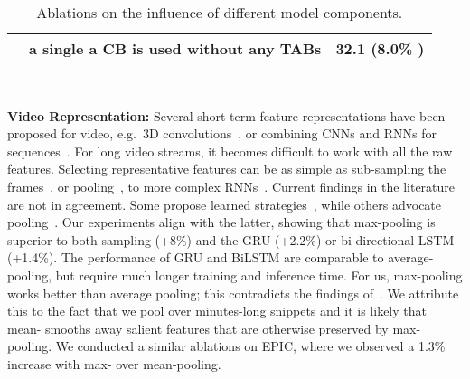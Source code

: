 \documentclass[runningheads]{llncs}
\makeatletter
\newcommand*{\eg}{e.g.\@\xspace}
\makeatother
\begin{document}
\begin{table}[t]
{\begin{tabular}{|l|l|l|l|l|l|l|}
    & \multicolumn{5}{l|}{\cellcolor{gray!20}a single a CB is used without any TABs} & \cellcolor{gray!20}32.1 (8.0\% ) \\ \hline
\end{tabular}}\\
\caption{Ablations on the influence of different model components.}
\label{tab:componentAblations} 
\end{table}  
 

\textbf{Video Representation:} Several short-term feature representations have been proposed for video, \eg~3D convolutions~\cite{tran2015learning}, or combining CNNs and RNNs for sequences~\cite{yue2015beyond,donahue2015long}. For long video streams, it becomes difficult to work with all the raw features. Selecting representative features can be as simple as sub-sampling the frames~\cite{feichtenhofer2019slowfast,xiao2020audiovisual}, or pooling~\cite{wang2016temporal}, to more complex RNNs~\cite{yue2015beyond}. Current findings in the literature are not in agreement. Some propose learned strategies~\cite{miech2017learnable,lee20182nd}, while others advocate pooling~\cite{wang2016temporal}. Our experiments align with the latter, showing that max-pooling is superior to both sampling (+8\%) and the GRU (+2.2\%) or bi-directional LSTM~\cite{conneau2017supervised} (+1.4\%). The performance of GRU and BiLSTM are comparable to average-pooling, but require much longer training and inference time. For us, max-pooling works better than average pooling; this contradicts the findings of~\cite{wang2016temporal}. We attribute this to the fact that we pool over minutes-long snippets and it is likely that mean- smooths away salient features that are otherwise preserved by max-pooling. We conducted a similar ablations on EPIC, where we observed a 1.3\% increase with max- over mean-pooling.
\end{document}
